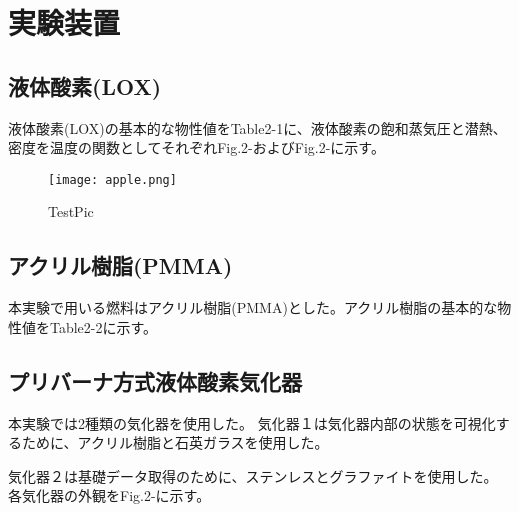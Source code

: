 \section{実験装置}
\subsection{液体酸素(LOX)}
液体酸素(LOX)の基本的な物性値をTable2-1に、液体酸素の飽和蒸気圧と潜熱、密度を温度の関数としてそれぞれFig.2-およびFig.2-に示す。
\begin{figure}
\centering
\texttt{[image: apple.png]}
\caption{TestPic}
\end{figure}
\subsection{アクリル樹脂(PMMA)}
本実験で用いる燃料はアクリル樹脂(PMMA)とした。アクリル樹脂の基本的な物性値をTable2-2に示す。

\subsection{プリバーナ方式液体酸素気化器}
本実験では2種類の気化器を使用した。
気化器１は気化器内部の状態を可視化するために、アクリル樹脂と石英ガラスを使用した。

気化器２は基礎データ取得のために、ステンレスとグラファイトを使用した。
各気化器の外観をFig.2-に示す。

%
